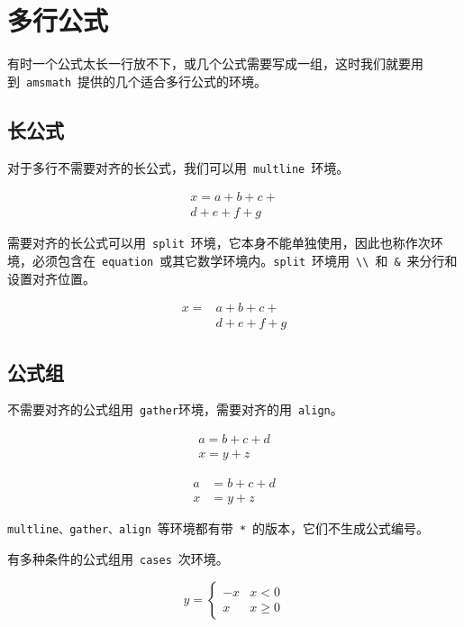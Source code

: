 \section{多行公式}
有时一个公式太长一行放不下，或几个公式需要写成一组，这时我们就要用到~\verb|amsmath|~提供的几个适合多行公式的环境。

\subsection{长公式}
对于多行不需要对齐的长公式，我们可以用~\verb|multline|~环境。
\begin{demo}
\begin{multline}
x=a+b+c+\\
d+e+f+g
\end{multline}
\end{demo}

需要对齐的长公式可以用~\verb|split|~环境，它本身不能单独使用，因此也称作次环境，必须包含在~\verb|equation|~或其它数学环境内。\verb|split|~环境用~\verb|\\|~和~\verb|&|~来分行和设置对齐位置。
\begin{demo}
\[ \begin{split}
x=&a+b+c+\\
  &d+e+f+g
\end{split} \]
\end{demo}

\subsection{公式组}
不需要对齐的公式组用~\verb|gather|环境，需要对齐的用~\verb|align|。
\begin{demo}
\begin{gather}
a=b+c+d\\
x=y+z
\end{gather}
\end{demo}

\begin{demo}
\begin{align}
a&=b+c+d\\
x&=y+z
\end{align}
\end{demo}

\verb|multline、gather、align|~等环境都有带~\verb|*|~的版本，它们不生成公式编号。

有多种条件的公式组用~\verb|cases|~次环境。
\begin{demo}
\[ y=\begin{cases}
-x & x<0\\
x & x\geq0
\end{cases} \]
\end{demo}

